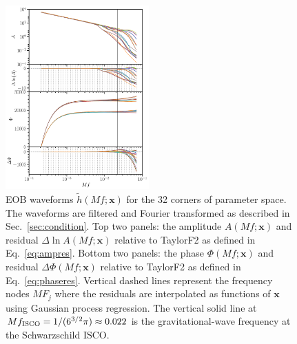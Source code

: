 \documentclass[prd,aps,letter,twocolumn,floatfix,notitlepage,nofootinbib]{revtex4-1}
\def\bx{\mathbf{x}}
\begin{document}
\begin{figure}[htb]
\centering
\includegraphics[width=0.49\textwidth]{hoff.pdf}
\caption{EOB waveforms $\tilde h(Mf; \bx)$ for the 32 corners of parameter space. The waveforms are filtered and Fourier transformed as described in Sec.~\ref{sec:condition}. Top two panels: the amplitude $A(Mf; \bx)$ and residual $\Delta\ln A(Mf; \bx)$ relative to TaylorF2 as defined in Eq.~\eqref{eq:ampres}. Bottom two panels: the phase $\Phi(Mf; \bx)$ and residual $\Delta\Phi(Mf; \bx)$ relative to TaylorF2 as defined in Eq.~\eqref{eq:phaseres}. Vertical dashed lines represent the frequency nodes $MF_j$ where the residuals are interpolated as functions of $\bx$ using Gaussian process regression. The vertical solid line at $Mf_{\rm ISCO} = 1/(6^{3/2}\pi) \approx 0.022$ is the gravitational-wave frequency at the Schwarzschild ISCO.}
\label{fig:hoff}
\end{figure}
\end{document}

